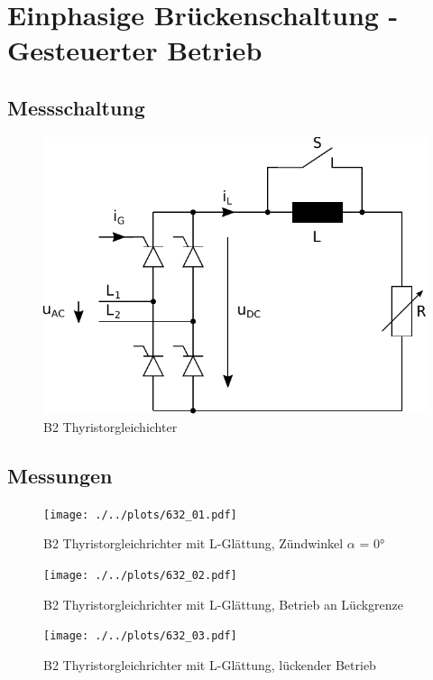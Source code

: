 \section{Einphasige Brückenschaltung - Gesteuerter Betrieb}

\subsection{Messschaltung}

\begin{figure}[h!]
    \centering
    \includegraphics[scale=\sscale]{./../fig/b2_thyristor.pdf}
    \caption{B2 Thyristorgleichichter}
    \label{fig:b2_tyristor}
\end{figure}

\subsection{Messungen}

\begin{figure}[h!]
    \centering
    \texttt{[image: ./../plots/632\_01.pdf]}
    \caption{B2 Thyristorgleichrichter mit L-Glättung, Zündwinkel $\alpha$ = 0°}
\end{figure}

\begin{figure}[h!]
    \centering
    \texttt{[image: ./../plots/632\_02.pdf]}
    \caption{B2 Thyristorgleichrichter mit L-Glättung, Betrieb an Lückgrenze}
\end{figure}

\begin{figure}[h!]
    \centering
    \texttt{[image: ./../plots/632\_03.pdf]}
    \caption{B2 Thyristorgleichrichter mit L-Glättung, lückender Betrieb}
\end{figure}

